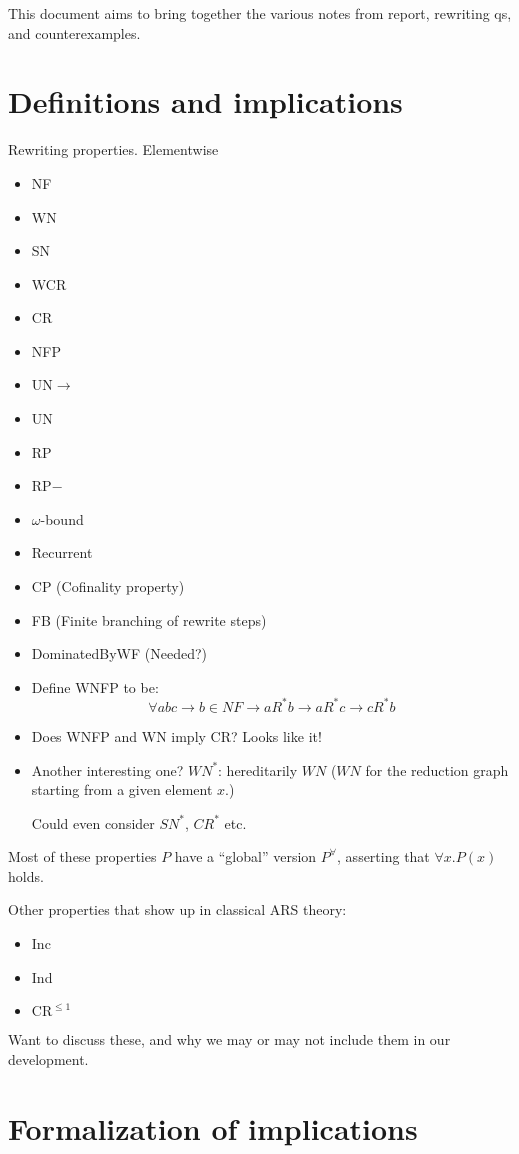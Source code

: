 \documentclass{scrartcl}
\begin{document}
This document aims to bring together the various notes from report, rewriting qs, and counterexamples. 


\section{Definitions and implications}
Rewriting properties.
Elementwise
\begin{itemize}
  \item NF
  \item WN
  \item SN
  \item WCR
  \item CR
  \item NFP
  \item UN$\to$
  \item UN
  \item RP
  \item RP$-$
  \item $\omega$-bound
  \item Recurrent
  \item CP (Cofinality property)
  \item FB (Finite branching of rewrite steps)
  \item DominatedByWF (Needed?)
  \item Define WNFP to be:
  \[\forall a b c \to b \in NF \to a R^* b \to a R^* c \to c R^* b \]
  \item Does WNFP and WN imply CR?  Looks like it!
  \item Another interesting one? $WN^*$: hereditarily $WN$ ($WN$ for the reduction graph starting from a given element $x$.)

  Could even consider $SN^*$, $CR^*$ etc.
\end{itemize}
Most of these properties $P$ have a ``global'' version $P^\forall$, asserting that $\forall x. P(x)$ holds.

Other properties that show up in classical ARS theory:
\begin{itemize}
  \item Inc
  \item Ind
  \item $\mathrm{CR}^{\le 1}$
\end{itemize}
Want to discuss these, and why we may or may not include them in our
development.
\newpage
\section{Formalization of implications}
\end{document}
